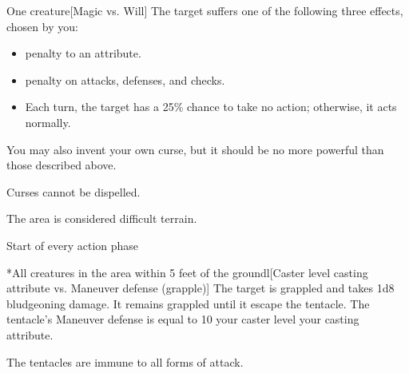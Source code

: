\spellrng{\rngclose}
\begin{spelltarget}{One creature}[Magic vs. Will]
    \spellsuccess The target suffers one of the following three effects, chosen by you:
    \begin{itemize}
        \item {} penalty to an attribute.
        \item {} penalty on attacks, defenses, and checks.
        \item Each turn, the target has a 25\% chance to take no action; otherwise, it acts normally.
    \end{itemize}
    \par You may also invent your own curse, but it should be no more powerful than those described above.
\end{spelltarget}
\spellnotes Curses cannot be dispelled.

\spelldur{\durshort \dismissable}
\spellline
\spelleffect The area is considered difficult terrain.
\begin{spelltrigger}{Start of every action phase}
    \begin{spelltargets}*{All creatures in the area within 5 feet of the ground}l[Caster level \add casting attribute vs. Maneuver defense (grapple)]
        \spellsuccess The target is grappled and takes 1d8 bludgeoning damage. It remains grappled until it escape the tentacle. The tentacle's Maneuver defense is equal to 10 \add your caster level \add your casting attribute.
    \end{spelltargets}
\end{spelltrigger}
\spellnotes The tentacles are immune to all forms of attack.

